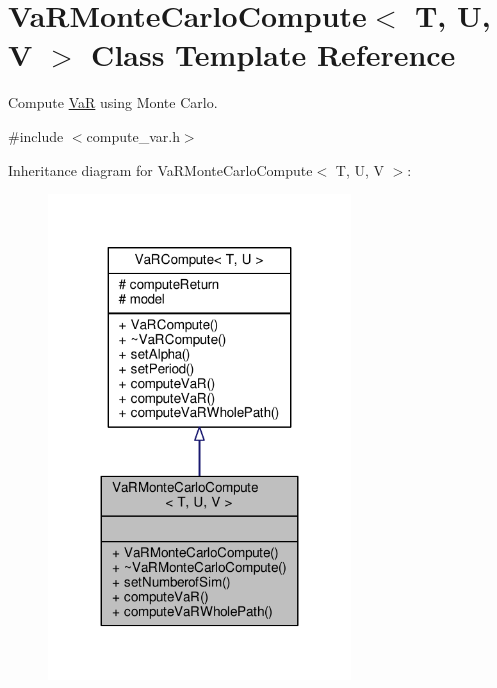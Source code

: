 \hypertarget{classVaRMonteCarloCompute}{}\section{Va\+R\+Monte\+Carlo\+Compute$<$ T, U, V $>$ Class Template Reference}
\label{classVaRMonteCarloCompute}


Compute \hyperlink{classVaR}{VaR} using Monte Carlo.  




{\ttfamily \#include $<$compute\+\_\+var.\+h$>$}



Inheritance diagram for Va\+R\+Monte\+Carlo\+Compute$<$ T, U, V $>$\+:
\nopagebreak
\begin{figure}[H]
\begin{center}
\leavevmode
\includegraphics[width=227pt]{classVaRMonteCarloCompute__inherit__graph}
\end{center}
\end{figure}


